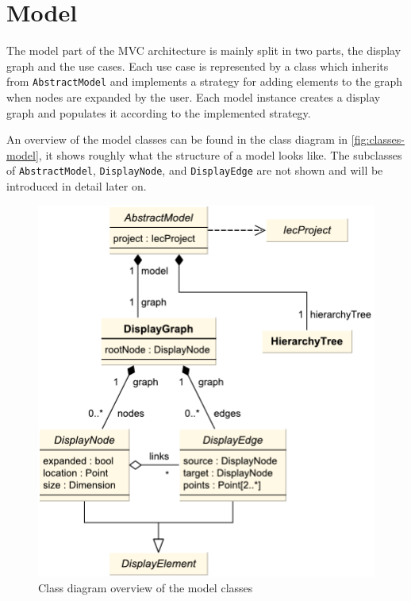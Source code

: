 \section{Model}

The model part of the MVC architecture is mainly split in two parts, the display graph and the use cases. Each use case 
is represented by a class which inherits from \lstinline|AbstractModel| and implements a strategy
\cite[pp.~315--323]{designpatterns} for adding elements to the graph when nodes are expanded by the user. Each model 
instance creates a display graph and populates it according to the implemented strategy.

An overview of the model classes can be found in the class diagram in \autoref{fig:classes-model}, it shows roughly 
what the structure of a model looks like. The subclasses of \lstinline|AbstractModel|, \lstinline|DisplayNode|, and 
\lstinline|DisplayEdge| are not shown and will be introduced in detail later on.

\begin{figure}[htb]
  \centering
    \includegraphics[scale=0.6]{bilder/classes-model}
  \caption{Class diagram overview of the model classes}
  \label{fig:classes-model}
\end{figure}

